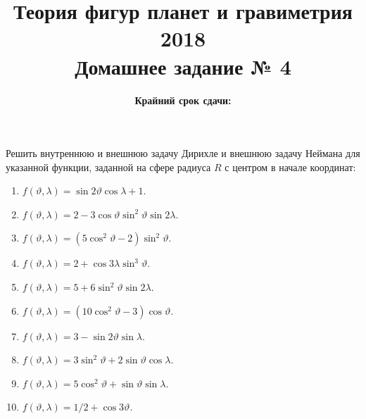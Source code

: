\documentclass[11pt, a4paper,addpoints]{exam}
\title{{\Large Теория фигур планет и гравиметрия 2018}\\ 
    {\bf\Large Домашнее задание № 4}}
\author{}
\date{\normalsize\bf Крайний срок сдачи: \DTMusedate{deadline}}
\theoremstyle{remark}
\renewcommand{\theta}{\vartheta}
\begin{document}
\maketitle
\thispagestyle{empty}
\begin{questions}
    \question Решить внутреннюю и внешнюю задачу Дирихле и внешнюю задачу Неймана для указанной
    функции, заданной на сфере радиуса $R$ с центром в начале координат:    
    \begin{enumerate}
        \item $f\left( \theta, \lambda \right) = \sin{2\theta}\cos\lambda + 1$.
        \item $f\left( \theta, \lambda \right) = 2 - 3\cos{\theta}\sin^2{\theta}\sin{2\lambda}$.
        \item $f\left( \theta, \lambda \right) = (5\cos^2\theta - 2)\sin^2\theta$.
        \item $f\left( \theta, \lambda \right) = 2 + \cos{3\lambda}\sin^3\theta$.
        \item $f\left( \theta, \lambda \right) = 5 + 6\sin^2\theta\sin{2\lambda}$.
        \item $f\left( \theta, \lambda \right) = (10\cos^2\theta - 3)\cos{\theta}$.
        \item $f\left( \theta, \lambda \right) = 3 - \sin{2\theta}\sin{\lambda}$.
        \item $f\left( \theta, \lambda \right) = 3\sin^2\theta + 2\sin\theta\cos\lambda$.
        \item $f\left( \theta, \lambda \right) = 5\cos^2\theta + \sin\theta\sin{\lambda}$.
        \item $f\left( \theta, \lambda \right) = 1/2 + \cos{3\theta}$.
    \end{enumerate}
    \end{questions}
\end{document}
